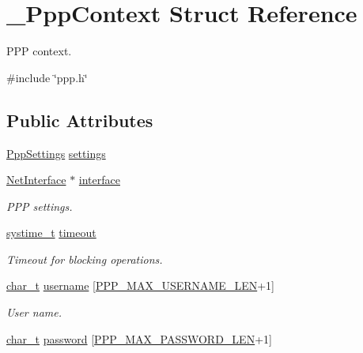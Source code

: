 \hypertarget{struct__PppContext}{}\section{\+\_\+\+Ppp\+Context Struct Reference}
\label{struct__PppContext}


P\+PP context.  




{\ttfamily \#include \char`\"{}ppp.\+h\char`\"{}}

\subsection*{Public Attributes}
\begin{DoxyCompactItemize}
\item 
\hyperlink{structPppSettings}{Ppp\+Settings} \hyperlink{struct__PppContext_ad9bfb6703f692d2a5b09344a98e58dbf}{settings}
\item 
\hyperlink{net_8h_a2234db8911a1148c9159979d8f5e0d6b}{Net\+Interface} $\ast$ \hyperlink{struct__PppContext_abeb1acef5b87805d20505a3e08225233}{interface}
\begin{DoxyCompactList}\small\item\em P\+PP settings. \end{DoxyCompactList}\item 
\hyperlink{compiler__port_8h_ae3e32a98d431a02106616da3071832dd}{systime\+\_\+t} \hyperlink{struct__PppContext_a3688a9a51ed43e378cde49360bd9f45a}{timeout}
\begin{DoxyCompactList}\small\item\em Timeout for blocking operations. \end{DoxyCompactList}\item 
\hyperlink{compiler__port_8h_a40bb5262bf908c328fbcfbe5d29d0201}{char\+\_\+t} \hyperlink{struct__PppContext_acbd19e91e16f3c43590dcea1815470da}{username} \mbox{[}\hyperlink{ppp_8h_acafaf0139acdee8a293aa63cd32666b6}{P\+P\+P\+\_\+\+M\+A\+X\+\_\+\+U\+S\+E\+R\+N\+A\+M\+E\+\_\+\+L\+EN}+1\mbox{]}
\begin{DoxyCompactList}\small\item\em User name. \end{DoxyCompactList}\item 
\hyperlink{compiler__port_8h_a40bb5262bf908c328fbcfbe5d29d0201}{char\+\_\+t} \hyperlink{struct__PppContext_a192649caed26a1998a818b36b706abf3}{password} \mbox{[}\hyperlink{ppp_8h_ad230927bc4f26aec472b73dd4e3fa46a}{P\+P\+P\+\_\+\+M\+A\+X\+\_\+\+P\+A\+S\+S\+W\+O\+R\+D\+\_\+\+L\+EN}+1\mbox{]}

\end{DoxyCompactItemize}
